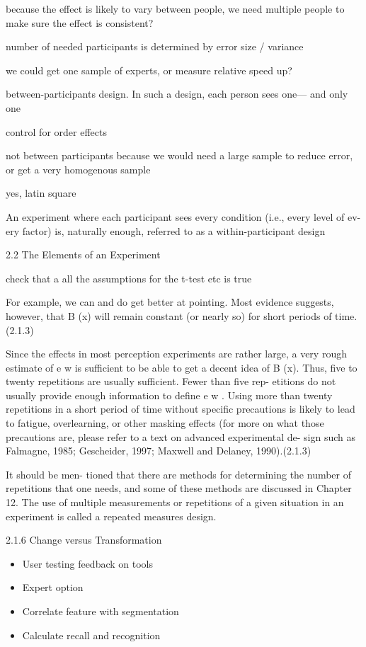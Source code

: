 because the effect is likely to vary between people, we need multiple people to make sure the effect is consistent?


number of needed participants is determined by error size / variance

we could get one sample of experts, or measure relative speed up?

between-participants design. In such a design, each person sees one—
and only one

control for order effects

not between participants because we would need a large sample to reduce error, or get a very homogenous sample

yes, latin square

An
experiment where each participant sees every condition (i.e., every level of ev-
ery factor) is, naturally enough, referred to as a within-participant design


2.2 The Elements of an Experiment

check that a all the assumptions for the t-test etc is true


For example, we can and do get better at pointing.
Most evidence suggests, however, that B (x) will remain constant (or nearly so) for short periods of time. (2.1.3)

Since the effects in most perception experiments are rather
large, a very rough estimate of e w is sufficient to be able to get a decent idea of
B (x). Thus, five to twenty repetitions are usually sufficient. Fewer than five rep-
etitions do not usually provide enough information to define e w . Using more
than twenty repetitions in a short period of time without specific precautions is likely to lead to fatigue, overlearning, or other masking effects (for more on
what those precautions are, please refer to a text on advanced experimental de-
sign such as Falmagne, 1985; Gescheider, 1997; Maxwell and Delaney, 1990).(2.1.3)

It should be men-
tioned that there are methods for determining the number of repetitions that
one needs, and some of these methods are discussed in Chapter 12. The use of
multiple measurements or repetitions of a given situation in an experiment is
called a repeated measures design.

2.1.6 Change versus Transformation

\begin{itemize}
\item User testing feedback on tools
\item Expert option

\item Correlate feature with segmentation
\item Calculate recall and recognition

\end{itemize}